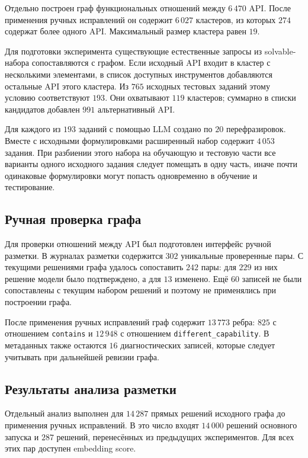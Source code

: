 \documentclass[12pt,a4paper]{article}
\begin{document}
Отдельно построен граф функциональных отношений между $6\,470$ API. После
применения ручных исправлений он содержит $6\,027$ кластеров, из которых $274$
содержат более одного API. Максимальный размер кластера равен $19$.

Для подготовки эксперимента существующие естественные запросы из
solvable-набора сопоставляются с графом. Если исходный API входит в кластер с
несколькими элементами, в список доступных инструментов добавляются остальные
API этого кластера. Из $765$ исходных тестовых заданий этому условию
соответствуют $193$. Они охватывают $119$ кластеров; суммарно в списки
кандидатов добавлен $991$ альтернативный API.

Для каждого из $193$ заданий с помощью LLM создано по $20$ перефразировок.
Вместе с исходными формулировками расширенный набор содержит $4\,053$ задания.
При разбиении этого набора на обучающую и тестовую части все варианты одного
исходного задания следует помещать в одну часть, иначе почти одинаковые
формулировки могут попасть одновременно в обучение и тестирование.

\subsection{Ручная проверка графа}

Для проверки отношений между API был подготовлен интерфейс ручной разметки.
В журналах разметки содержится $302$ уникальные проверенные пары. С текущими
решениями графа удалось сопоставить $242$ пары: для $229$ из них решение модели
было подтверждено, а для $13$ изменено. Ещё $60$ записей не были сопоставлены с
текущим набором решений и поэтому не применялись при построении графа.

После применения ручных исправлений граф содержит $13\,773$ ребра: $825$ с
отношением \texttt{contains} и $12\,948$ с отношением
\texttt{different\_capability}. В метаданных также остаются $16$
диагностических записей, которые следует учитывать при дальнейшей ревизии
графа.

\subsection{Результаты анализа разметки}

Отдельный анализ выполнен для $14\,287$ прямых решений исходного графа до
применения ручных исправлений. В это число входят $14\,000$ решений основного
запуска и $287$ решений, перенесённых из предыдущих экспериментов. Для всех
этих пар доступен embedding score.
\end{document}
